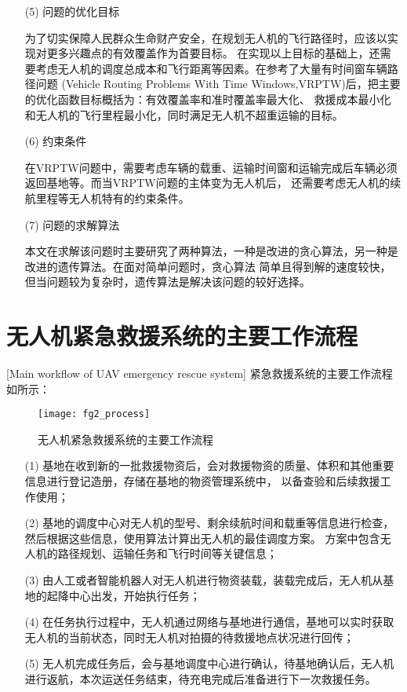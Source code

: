 \begin{itemize}
	\item[(5)]
	问题的优化目标

	\qquad 为了切实保障人民群众生命财产安全，在规划无人机的飞行路径时，应该以实现对更多兴趣点的有效覆盖作为首要目标。
	在实现以上目标的基础上，还需要考虑无人机的调度总成本和飞行距离等因素。在参考了大量有时间窗车辆路径问题
	(Vehicle Routing Problems With Time Windows,VRPTW)后，把主要的优化函数目标概括为：有效覆盖率和准时覆盖率最大化、
	救援成本最小化和无人机的飞行里程最小化，同时满足无人机不超重运输的目标。

	\item[(6)]
	约束条件
	

	\qquad 在VRPTW问题中，需要考虑车辆的载重、运输时间窗和运输完成后车辆必须返回基地等。而当VRPTW问题的主体变为无人机后，
	还需要考虑无人机的续航里程等无人机特有的约束条件。

	\item[(7)]
	问题的求解算法


	\qquad 本文在求解该问题时主要研究了两种算法，一种是改进的贪心算法，另一种是改进的遗传算法。在面对简单问题时，贪心算法
	简单且得到解的速度较快，但当问题较为复杂时，遗传算法是解决该问题的较好选择。
\end{itemize}

\section{无人机紧急救援系统的主要工作流程}[Main workflow of UAV emergency rescue system]
紧急救援系统的主要工作流程如所示：

\begin{figure}[ht]
	\centering
	\texttt{[image: fg2\_process]}
	\caption{无人机紧急救援系统的主要工作流程}
	\label{fg202}
\end{figure}

\begin{itemize}
	\item [(1)]基地在收到新的一批救援物资后，会对救援物资的质量、体积和其他重要信息进行登记造册，存储在基地的物资管理系统中，
	以备查验和后续救援工作使用； 
	\item [(2)]基地的调度中心对无人机的型号、剩余续航时间和载重等信息进行检查，然后根据这些信息，使用算法计算出无人机的最佳调度方案。
	方案中包含无人机的路径规划、运输任务和飞行时间等关键信息；
	\item [(3)]由人工或者智能机器人对无人机进行物资装载，装载完成后，无人机从基地的起降中心出发，开始执行任务；
	\item [(4)]在任务执行过程中，无人机通过网络与基地进行通信，基地可以实时获取无人机的当前状态，同时无人机对拍摄的待救援地点状况进行回传；
	\item [(5)]无人机完成任务后，会与基地调度中心进行确认，待基地确认后，无人机进行返航，本次运送任务结束，待充电完成后准备进行下一次救援任务。
\end{itemize}

